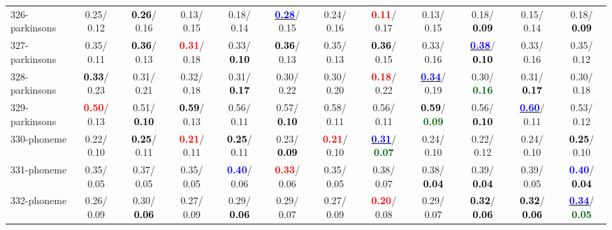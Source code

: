 \begin{table}[h]
\begin{center}
{\begin{tabular}{lc|c|c|c|c|c|c|c|c|c|c}
326-parkinsons &   0.25/  0.12 & \textcolor{black}{\textbf{  0.26}}/  0.16 &   0.13/  0.15 &   0.18/  0.14 & \underline{\textcolor{blue}{\textbf{  0.28}}}/  0.15 &   0.24/  0.16 & \textcolor{red}{\textbf{  0.11}}/  0.17 &   0.13/  0.15 &   0.18/\textcolor{black}{\textbf{  0.09}} &   0.15/  0.14 &   0.18/\textcolor{black}{\textbf{  0.09}} \\
327-parkinsons &   0.35/  0.11 & \textcolor{black}{\textbf{  0.36}}/  0.13 & \textcolor{red}{\textbf{  0.31}}/  0.18 &   0.33/\textcolor{black}{\textbf{  0.10}} & \textcolor{black}{\textbf{  0.36}}/  0.13 &   0.35/  0.13 & \textcolor{black}{\textbf{  0.36}}/  0.15 &   0.33/  0.16 & \underline{\textcolor{blue}{\textbf{  0.38}}}/\textcolor{black}{\textbf{  0.10}} &   0.33/  0.16 &   0.35/  0.12 \\ \hline
328-parkinsons & \textcolor{black}{\textbf{  0.33}}/  0.23 &   0.31/  0.21 &   0.32/  0.18 &   0.31/\textcolor{black}{\textbf{  0.17}} &   0.30/  0.22 &   0.30/  0.20 & \textcolor{red}{\textbf{  0.18}}/  0.22 & \underline{\textcolor{blue}{\textbf{  0.34}}}/  0.19 &   0.30/\textcolor{darkgreen}{\textbf{  0.16}} &   0.31/\textcolor{black}{\textbf{  0.17}} &   0.30/  0.18 \\
329-parkinsons & \textcolor{red}{\textbf{  0.50}}/  0.13 &   0.51/\textcolor{black}{\textbf{  0.10}} & \textcolor{black}{\textbf{  0.59}}/  0.13 &   0.56/  0.11 &   0.57/\textcolor{black}{\textbf{  0.10}} &   0.58/  0.11 &   0.56/  0.11 & \textcolor{black}{\textbf{  0.59}}/\textcolor{darkgreen}{\textbf{  0.09}} &   0.56/\textcolor{black}{\textbf{  0.10}} & \underline{\textcolor{blue}{\textbf{  0.60}}}/  0.11 &   0.53/  0.12 \\
330-phoneme &   0.22/  0.10 & \textcolor{black}{\textbf{  0.25}}/  0.11 & \textcolor{red}{\textbf{  0.21}}/  0.11 & \textcolor{black}{\textbf{  0.25}}/  0.11 &   0.23/\textcolor{black}{\textbf{  0.09}} & \textcolor{red}{\textbf{  0.21}}/  0.10 & \underline{\textcolor{blue}{\textbf{  0.31}}}/\textcolor{darkgreen}{\textbf{  0.07}} &   0.24/  0.10 &   0.22/  0.12 &   0.24/  0.10 & \textcolor{black}{\textbf{  0.25}}/  0.10 \\
331-phoneme &   0.35/  0.05 &   0.37/  0.05 &   0.35/  0.05 & \textcolor{blue}{\textbf{  0.40}}/  0.06 & \textcolor{red}{\textbf{  0.33}}/  0.06 &   0.35/  0.05 &   0.38/  0.07 &   0.38/\textcolor{black}{\textbf{  0.04}} &   0.39/\textcolor{black}{\textbf{  0.04}} &   0.39/  0.05 & \textcolor{blue}{\textbf{  0.40}}/\textcolor{black}{\textbf{  0.04}} \\
332-phoneme &   0.26/  0.09 &   0.30/\textcolor{black}{\textbf{  0.06}} &   0.27/  0.09 &   0.29/\textcolor{black}{\textbf{  0.06}} &   0.29/  0.07 &   0.27/  0.09 & \textcolor{red}{\textbf{  0.20}}/  0.08 &   0.29/  0.07 & \textcolor{black}{\textbf{  0.32}}/\textcolor{black}{\textbf{  0.06}} & \textcolor{black}{\textbf{  0.32}}/\textcolor{black}{\textbf{  0.06}} & \underline{\textcolor{blue}{\textbf{  0.34}}}/\textcolor{darkgreen}{\textbf{  0.05}} \\

\end{tabular}}
\end{center}
\end{table}
